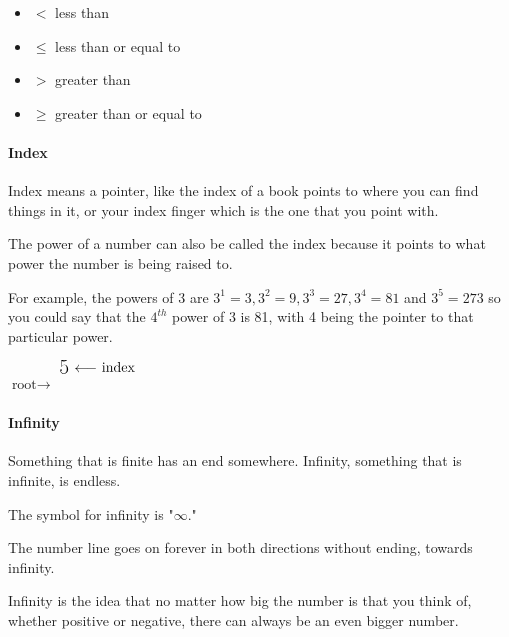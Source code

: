 \documentclass[12pt]{article}
\begin{document}
\begin{itemize}
    \item \( < \) less than
    \item \( \leq \) less than or equal to
    \item \( > \) greater than
    \item \( \geq \) greater than or equal to
\end{itemize}

\paragraph{Index}
Index means a pointer, like the index of a book points to where you can find things in it, or your index finger which is the one that you point with.

The power of a number can also be called the index because it points to what power the number is being raised to.

For example, the powers of 3 are $3^1=3, 3^2=9, 3^3=27, 3^4=81$ and $3^5=273$ so you could say that the $4^{th}$ power of 3 is 81, with 4 being the pointer to that particular power.

\begin{center}
$\text{root}\rightarrow$
{\fontsize{30}{34}}
$\raisebox{1.6ex}{\textsuperscript{{\fontsize{15}{20}\selectfont 5}}} \ \raisebox{2.7ex}{$\longleftarrow$\ }\raisebox{1.9ex}{\textsuperscript{\normalsize{\text{index}}}}$
\normalsize
\end{center}

\paragraph{Infinity}
Something that is finite has an end somewhere. Infinity, something that is infinite, is endless.

The symbol for infinity is "$\infty.$"


The number line goes on forever in both directions without ending, towards infinity.

Infinity is the idea that no matter how big the number is that you think of, whether positive or negative, there can always be an even bigger number.
\end{document}
